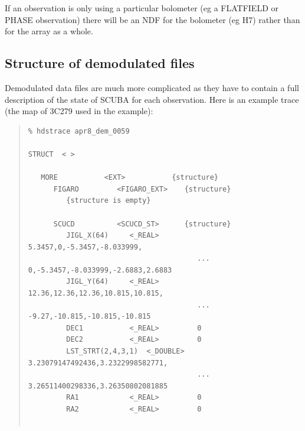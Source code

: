 \documentclass[twoside,11pt]{article}
\newenvironment{myquote}{\begin{quote}\begin{small}}{\end{small}\end{quote}}
\renewcommand{\_}{\texttt{\symbol{95}}}
\begin{document}
If an observation is only using a particular bolometer (eg a FLATFIELD or
PHASE observation) there will be an NDF for the bolometer (eg H7) rather than
for the array as a whole.


\subsection{Structure of demodulated files\label{demodstruc}}

Demodulated data files are much more complicated as they have to contain a
full description of the state of SCUBA for each observation. 
Here is an example trace (the map of 3C279 used in the example):
\begin{myquote}
\begin{verbatim}
% hdstrace apr8_dem_0059
 
STRUCT  < >
 
   MORE           <EXT>           {structure}
      FIGARO         <FIGARO_EXT>    {structure}
         {structure is empty}
 
      SCUCD          <SCUCD_ST>      {structure}
         JIGL_X(64)     <_REAL>         5.3457,0,-5.3457,-8.033999,
                                        ... 0,-5.3457,-8.033999,-2.6883,2.6883
         JIGL_Y(64)     <_REAL>         12.36,12.36,12.36,10.815,10.815,
                                        ... -9.27,-10.815,-10.815,-10.815
         DEC1           <_REAL>         0
         DEC2           <_REAL>         0
         LST_STRT(2,4,3,1)  <_DOUBLE>   3.23079147492436,3.2322998582771,
                                        ... 3.26511400298336,3.26350802081885
         RA1            <_REAL>         0
         RA2            <_REAL>         0
 

\end{verbatim}
\end{myquote}
\end{document}
